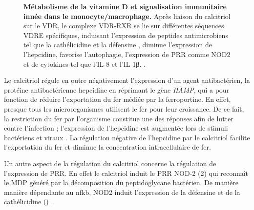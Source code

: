 \documentclass[
  a4paper,
  DIV=11,
  numbers=noendperiod,
  listof=totoc]{scrreprt}
\begin{document}
\begin{figure}


\caption[Métabolisme de la vitamine D et signalisation immunitaire innée
dans le
monocyte/macrophage.]{\label{fig-vd-immune-signaling}\textbf{Métabolisme
de la vitamine D et signalisation immunitaire innée dans le
monocyte/macrophage.} Après liaison du calcitriol sur le \ac{VDR}, le
complexe \ac{VDR}-\ac{RXR} se lie sur différentes séquences \ac{VDRE}
spécifiques, induisant l'expression de peptides antimicrobiens tel que
la cathélicidine et la défensine , diminue l'expression de
l'hepcidine, favorise l'autophagie, l'expression de \ac{PRR} comme NOD2
et de cytokines tel que l'IL-8 et l'IL-1β. \autocite{Bishop.2021}.}

\end{figure}%

Le calcitriol régule en outre négativement l'expression d'un agent
antibactérien, la protéine antibactérienne hepcidine en réprimant le
gène \emph{HAMP}, qui a pour fonction de réduire l'exportation du fer
médiée par la ferroportine. En effet, presque tous les microorganismes
utilisent le fer pour leur croissance. De ce fait, la restriction du fer
par l'organisme constitue une des réponses afin de lutter contre
l'infection ; l'expression de l'hepcidine est augmentée lors de stimuli
bactériens et viraux \autocite{Bishop.2021}. La régulation négative de
l'hepcidine par le calcitriol facilite l'exportation du fer et diminue
la concentration intracellulaire de fer.

Un autre aspect de la régulation du calcitriol concerne la régulation de
l'expression de \ac{PRR}. En effet le calcitriol induit le \ac{PRR}
\acl{NOD}-2 (2) qui reconnaît le \ac{MDP} généré par la
décomposition du peptidoglycane bactérien. De manière manière dépendante
au \ac{nfkb}, NOD2 induit l'expression de la défensine  et de
la cathélicidine ()
\autocite{Bishop.2021,Ismailova.2022}.
\end{document}
